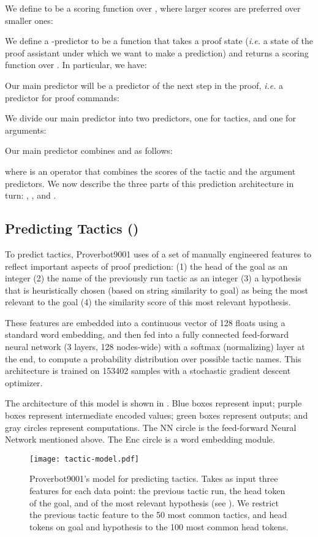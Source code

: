\documentclass[sigplan,screen]{acmart}
\newcommand{\name}{Proverbot9001\xspace}
\renewcommand{\>}{\quad}
\begin{document}
We define  to be a scoring function over , where larger scores are preferred over smaller ones:

We define a -predictor  to be a function that takes a proof state  (\emph{i.e.} a state of the proof assistant under which we want to make a prediction) and returns a scoring function over . In particular, we have:

Our main predictor  will be a predictor of the next step in the proof, \emph{i.e.} a predictor for proof commands:

We divide our main predictor into two predictors, one for tactics, and one for arguments:


Our main predictor  combines  and  as follows:

where  is an operator that combines the scores of the tactic and the argument predictors.
We now describe the three parts of this prediction architecture in turn: , , and .

\subsection{Predicting Tactics ()}
\label{ssec:ptac}

To predict tactics,
  \name{} uses of a set of manually engineered features
  to reflect important aspects of proof prediction:
  (1) the head of the goal as an integer
  (2) the name of the previously run tactic as an integer
  (3) a hypothesis that is heuristically chosen (based on string similarity to goal)
      as being the most relevant to the goal
  (4) the similarity score of this most relevant hypothesis.

These features are embedded into a continuous vector of 128 floats
  using a standard word embedding,
  and then fed into a fully connected feed-forward neural network
  (3 layers, 128 nodes-wide) with a softmax (normalizing) layer at the end,
  to compute a probability distribution over possible tactic names.
This architecture is trained on 153402 samples
  with a stochastic gradient descent optimizer.

The architecture of this model is shown in .
Blue boxes represent input;
  purple boxes represent intermediate encoded values;
  green boxes represent outputs;
  and gray circles represent computations.
The NN circle is the feed-forward Neural Network mentioned above.
The Enc circle is a word embedding module.

\begin{figure}
\texttt{[image: tactic-model.pdf]}
\caption{\name{}'s model for predicting tactics. Takes as input three
  features for each data point: the previous tactic run, the head
  token of the goal, and of the most relevant hypothesis (see
  ). We restrict the previous tactic feature to the 50
  most common tactics, and head tokens on goal and hypothesis to the
  100 most common head tokens.}
\label{fig:tactic-model}
\end{figure}
\end{document}
